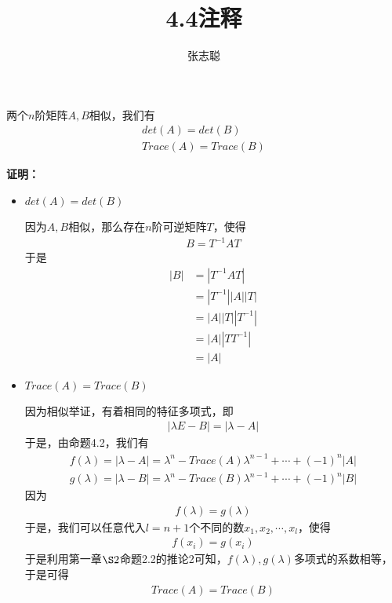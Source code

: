 \documentclass{article}
\begin{document}
\title{4.4注释}
\author{张志聪}
\maketitle

\begin{zremark}
  两个$n$阶矩阵$A, B$相似，我们有
  \begin{align*}
    det(A) = det(B) \\
    Trace(A) = Trace(B)
  \end{align*}
\end{zremark}

\textbf{证明：}

\begin{itemize}
  \item $det(A) = det(B)$

        因为$A, B$相似，那么存在$n$阶可逆矩阵$T$，使得
        \begin{align*}
          B = T^{-1}AT
        \end{align*}
        于是
        \begin{align*}
          |B| & = |T^{-1}AT|       \\
              & = |T^{-1}||A||T|   \\
              & = |A| |T| |T^{-1}| \\
              & = |A| |T T^{-1}|   \\
              & = |A|
        \end{align*}

  \item $Trace(A) = Trace(B)$

        因为相似举证，有着相同的特征多项式，即
        \begin{align*}
          |\lambda E - B| = |\lambda - A|
        \end{align*}
        于是，由命题4.2，我们有
        \begin{align*}
          f(\lambda) = |\lambda - A| = \lambda^n - Trace(A)\lambda^{n - 1} + \cdots + (-1)^n |A| \\
          g(\lambda) = |\lambda - B| = \lambda^n - Trace(B)\lambda^{n - 1} + \cdots + (-1)^n |B|
        \end{align*}
        因为
        \begin{align*}
          f(\lambda) = g(\lambda)
        \end{align*}
        于是，我们可以任意代入$l = n + 1$个不同的数$x_1, x_2, \cdots, x_l$，使得
        \begin{align*}
          f(x_i) = g(x_i)
        \end{align*}
        于是利用第一章$\S 2$命题2.2的推论2可知，$f(\lambda), g(\lambda)$多项式的系数相等，
        于是可得
        \begin{align*}
          Trace(A) = Trace(B)
        \end{align*}
\end{itemize}
\end{document}
